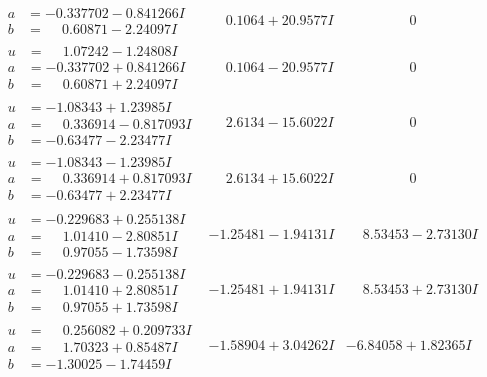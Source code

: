 \documentclass[1p]{elsarticle_modified}
\theoremstyle{definition}
\begin{document}
$$\begin{array}{c|c|c}
\begin{aligned}
a &= -0.337702 - 0.841266 I \\
b &= \phantom{-}0.60871 - 2.24097 I\end{aligned}
 & \phantom{-}0.1064 + 20.9577 I & \phantom{-0.000000 } 0 \\ \hline\begin{aligned}
u &= \phantom{-}1.07242 - 1.24808 I \\
a &= -0.337702 + 0.841266 I \\
b &= \phantom{-}0.60871 + 2.24097 I\end{aligned}
 & \phantom{-}0.1064 - 20.9577 I & \phantom{-0.000000 } 0 \\ \hline\begin{aligned}
u &= -1.08343 + 1.23985 I \\
a &= \phantom{-}0.336914 - 0.817093 I \\
b &= -0.63477 - 2.23477 I\end{aligned}
 & \phantom{-}2.6134 - 15.6022 I & \phantom{-0.000000 } 0 \\ \hline\begin{aligned}
u &= -1.08343 - 1.23985 I \\
a &= \phantom{-}0.336914 + 0.817093 I \\
b &= -0.63477 + 2.23477 I\end{aligned}
 & \phantom{-}2.6134 + 15.6022 I & \phantom{-0.000000 } 0 \\ \hline\begin{aligned}
u &= -0.229683 + 0.255138 I \\
a &= \phantom{-}1.01410 - 2.80851 I \\
b &= \phantom{-}0.97055 - 1.73598 I\end{aligned}
 & -1.25481 - 1.94131 I & \phantom{-}8.53453 - 2.73130 I \\ \hline\begin{aligned}
u &= -0.229683 - 0.255138 I \\
a &= \phantom{-}1.01410 + 2.80851 I \\
b &= \phantom{-}0.97055 + 1.73598 I\end{aligned}
 & -1.25481 + 1.94131 I & \phantom{-}8.53453 + 2.73130 I \\ \hline\begin{aligned}
u &= \phantom{-}0.256082 + 0.209733 I \\
a &= \phantom{-}1.70323 + 0.85487 I \\
b &= -1.30025 - 1.74459 I\end{aligned}
 & -1.58904 + 3.04262 I & -6.84058 + 1.82365 I \\ \hline\begin{aligned}

\end{aligned}
\end{array}$$
\end{document}
